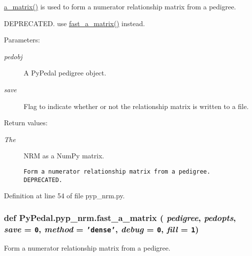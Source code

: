 \hyperlink{namespacePyPedal_1_1pyp__nrm_160c730a5f8ed4809c427645d3331262}{a\_\-matrix()} is used to form a numerator relationship matrix from a pedigree. 

DEPRECATED. use \hyperlink{namespacePyPedal_1_1pyp__nrm_d86974b6cb70f5165d7f9b41b68b613e}{fast\_\-a\_\-matrix()} instead. \begin{Desc}
\item[Parameters:]
\begin{description}
\item[{\em pedobj}]A Py\-Pedal pedigree object. \item[{\em save}]Flag to indicate whether or not the relationship matrix is written to a file. \end{description}
\end{Desc}
\begin{Desc}
\item[Return values:]
\begin{description}
\item[{\em The}]NRM as a Num\-Py matrix.

\footnotesize\begin{verbatim}Form a numerator relationship matrix from a pedigree.  DEPRECATED.
\end{verbatim}
\normalsize
 \end{description}
\end{Desc}


Definition at line 54 of file pyp\_\-nrm.py.\hypertarget{namespacePyPedal_1_1pyp__nrm_d86974b6cb70f5165d7f9b41b68b613e}{
\subsubsection[fast\_\-a\_\-matrix]{\setlength{\rightskip}{0pt plus 5cm}def Py\-Pedal.pyp\_\-nrm.fast\_\-a\_\-matrix ( {\em pedigree},  {\em pedopts},  {\em save} = {\tt 0},  {\em method} = {\tt 'dense'},  {\em debug} = {\tt 0},  {\em fill} = {\tt 1})}}
\label{namespacePyPedal_1_1pyp__nrm_d86974b6cb70f5165d7f9b41b68b613e}


Form a numerator relationship matrix from a pedigree. 

